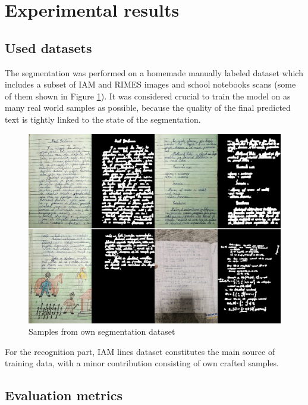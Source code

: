 \section{Experimental results}
\label{sec:ch5sec5}

\subsection{Used datasets}

The segmentation was performed on a homemade manually labeled dataset which includes a subset of IAM and RIMES images and school notebooks scans (some of them shown in Figure \ref{FigCustomDS}). It was considered crucial to train the model on as many real world samples as possible, because the quality of the final predicted text is tightly linked to the state of the segmentation. 

\begin{figure}[htbp]
    \centering
        \includegraphics[scale=0.6]{figures/custom_db.png}
    \caption{Samples from own segmentation dataset}    
    \label{FigCustomDS}
\end{figure}

For the recognition part, IAM lines dataset constitutes the main source of training data, with a minor contribution consisting of own crafted samples.



\subsection{Evaluation metrics}

